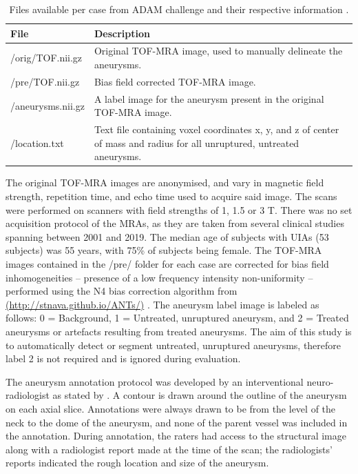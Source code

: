 \begin{table}[h]
	\centering
	\begin{tabular}{ l  | p{8cm} }
	\textbf{File} & \textbf{Description} \\
	\hline
	/orig/TOF.nii.gz & Original TOF-MRA image, used to manually delineate the aneurysms. \\
	/pre/TOF.nii.gz & Bias field corrected TOF-MRA image. \\
	/aneurysms.nii.gz & A label image for the aneurysm present in the original TOF-MRA image.\\
	/location.txt & Text file containing voxel coordinates x, y, and z of center of mass and radius for all unruptured, untreated aneurysms. \\
	\end{tabular}
	\caption[Table of files contained dataset]{Files available per case from ADAM challenge and their respective information \cite{Timmins2020}.}
	\label{table:adam_files}
\end{table}

The original TOF-MRA images are anonymised, and vary in magnetic field strength, repetition time, and echo time used to acquire said image. The scans were performed on scanners with field strengths of 1, 1.5 or 3 T. There was no set acquisition protocol of the MRAs, as they are taken from several clinical studies spanning between 2001 and 2019. The median age of subjects with UIAs (53 subjects) was 55 years, with 75\% of subjects being female.
The TOF-MRA images contained in the /pre/ folder for each case are corrected for bias field inhomogeneities -- presence of a low frequency intensity non-uniformity -- performed using the N4 bias correction algorithm from \href{http://stnava.github.io/ANTs/}{(http://stnava.github.io/ANTs/)} \cite{Tustison2010}. The aneurysm label image is labeled as follows: 0 = Background, 1 = Untreated, unruptured aneurysm, and 2 = Treated aneurysms or artefacts resulting from treated aneurysms. The aim of this study is to automatically detect or segment untreated, unruptured aneurysms, therefore label 2 is not required and is ignored during evaluation. 

The aneurysm annotation protocol was developed by an interventional neuro-radiologist as stated by \citeauthor{Timmins2020}. A contour is drawn around the outline of the aneurysm on each axial slice. Annotations were always drawn to be from the level of the neck to the dome of the aneurysm, and none of the parent vessel was included in the annotation. During annotation, the raters had access to the structural image along with a radiologist report made at the time of the scan; the radiologists’ reports indicated the rough location and size of the aneurysm.

